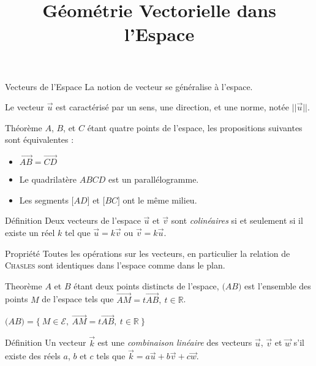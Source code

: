 \documentclass{cours}
\title{Géométrie Vectorielle dans l'Espace}
\begin{document}

    \begin{Gpartie}{Vecteurs de l'Espace} 
        La notion de vecteur se généralise à l'espace.

        Le vecteur $\vec{u}$ est caractérisé par un sens, une direction, et une norme, notée $\lvert\lvert{\vec{u}}\rvert\rvert$.
        \begin{Spartie}{Théorème} 
            $A$, $B$, et $C$ étant quatre points de l'espace, les propositions suivantes sont équivalentes :
            \begin{itemize}
                \item $\overrightarrow{AB}=\overrightarrow{CD}$
                \item Le quadrilatère $ABCD$ est un parallélogramme.
                \item Les segments $\big[AD\big]$ et $\big[BC\big]$ ont le même milieu.
            \end{itemize}
        \end{Spartie}
        \begin{Spartie}{Définition} 
            Deux vecteurs de l'espace $\vec{u}$ et $\vec{v}$ sont \emph{colinéaires} si et seulement si il existe un réel $k$ tel que $\vec{u}=k\vec{v}$ ou $\vec{v}=k\vec{u}$.
        \end{Spartie}
        \begin{Spartie}{Propriété} 
            Toutes les opérations sur les vecteurs, en particulier la relation de \textsc{Chasles} sont identiques dans l'espace comme dans le plan.
        \end{Spartie}
        \begin{Spartie}{Theorème} 
            $A$ et $B$ étant deux points distincts de l'espace, $\big(AB\big)$ est l'ensemble des points $M$ de l'espace tels que $\overrightarrow{AM}=t \overrightarrow{AB},\ t\in\mathbb{R}$.

            $\big(AB\big)=\big\{~M\in\mathcal{E},~\overrightarrow{AM}=t\overrightarrow{AB},~t\in\mathbb{R}~\big\}$
        \end{Spartie}
        \begin{Spartie}{Définition} 
            Un vecteur $\vec{k}$ est une \emph{combinaison linéaire} des vecteurs $\vec{u}$, $\vec{v}$ et $\vec{w}$ s'il existe des réels $a$, $b$ et $c$ tels que $\vec{k}=a\vec{u}+b\vec{v}+c\vec{w}$.
        \end{Spartie}
    \end{Gpartie}
\end{document}
